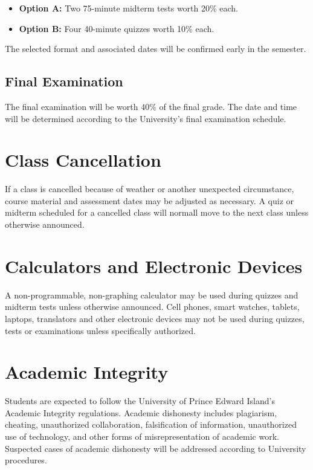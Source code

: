 \documentclass[10pt]{article}
\begin{document}
\begin{itemize}
    \item \textbf{Option A:} Two 75-minute midterm tests worth 20\% each.
    \item \textbf{Option B:} Four 40-minute quizzes worth 10\% each.
\end{itemize}

The selected format and associated dates will be confirmed early in the
semester.

\subsection{Final Examination}
The final examination will be worth 40\% of the final grade. The date and time will be determined according to the University's final examination schedule.


\section{Class Cancellation}
If a class is cancelled because of weather or another unexpected circumstance, course material and assessment dates may be adjusted as necessary. A quiz or midterm scheduled for a cancelled class will normall move to the next class unless otherwise announced.


\section{Calculators and Electronic Devices}
A non-programmable, non-graphing calculator may be used during quizzes and midterm tests unless otherwise announced. Cell phones, smart watches, tablets, laptops, translators and other electronic devices may not be used during quizzes, tests or examinations unless specifically authorized.


\section{Academic Integrity}
Students are expected to follow the University of Prince Edward Island's Academic Integrity regulations. Academic dishonesty includes plagiarism, cheating, unauthorized collaboration, falsification of information, unauthorized use of technology, and other forms of misrepresentation of academic work. Suspected cases of academic dishonesty will be addressed according to University procedures.
\end{document}
